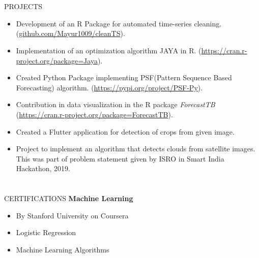 \documentclass{my_cv}
\begin{document}
\section{\faProjectDiagram}{PROJECTS}
	\begin{itemize}[noitemsep]
		\item Development of an R Package for automated time-series cleaning. (\url{github.com/Mayur1009/cleanTS}).
		\item Implementation of an optimization algorithm JAYA in R. (\url{https://cran.r-project.org/package=Jaya}).
		\item Created Python Package implementing PSF(Pattern Sequence Based Forecasting) algorithm. (\url{https://pypi.org/project/PSF-Py}).
		\item Contribution in data visualization in the R package \textit{ForecastTB} (\url{https://cran.r-project.org/package=ForecastTB}).
		\item Created a Flutter application for detection of crops from given image.
		\item Project to implement an algorithm that detects clouds from satellite images. This was part of problem statement given by ISRO in Smart India Hackathon, 2019.
		
	\end{itemize}

\section{\faCertificate}{CERTIFICATIONS}
	\noindent	
	\textbf{\aiCoursera\hspace{1mm} Machine Learning}
	\begin{itemize}
		\item By Stanford University on Coursera
		\item Logistic Regression
		\item Machine Learning Algorithms
	\end{itemize}
	
\end{document}

